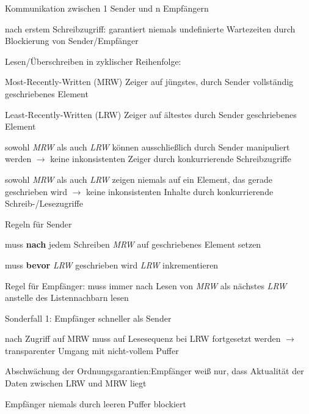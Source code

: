 \documentclass[a4paper]{article}
\begin{document}
\begin{multicols}{3}
\begin{center}
        Kommunikation zwischen 1 Sender und n Empfängern
    \end{center}
    \begin{itemize*}
        \item nach erstem Schreibzugriff: garantiert niemals undefinierte Wartezeiten durch Blockierung von Sender/Empfänger
        \item Lesen/Überschreiben in zyklischer Reihenfolge:
        \item Most-Recently-Written (MRW) Zeiger auf jüngstes, durch Sender vollständig geschriebenes Element
        \item Least-Recently-Written (LRW) Zeiger auf ältestes durch Sender geschriebenes Element
        \item sowohl \emph{MRW} als auch \emph{LRW} können ausschließlich durch Sender manipuliert werden $\rightarrow$ keine inkonsistenten Zeiger durch konkurrierende Schreibzugriffe
        \item sowohl \emph{MRW} als auch \emph{LRW} zeigen niemals auf ein Element, das gerade geschrieben wird $\rightarrow$ keine inkonsistenten Inhalte durch konkurrierende Schreib-/Lesezugriffe
        \item Regeln für Sender
        \begin{itemize*}
            \item muss \textbf{nach} jedem Schreiben \emph{MRW} auf geschriebenes Element setzen
            \item muss \textbf{bevor} \emph{LRW} geschrieben wird \emph{LRW} inkrementieren
        \end{itemize*}
        \item Regel für Empfänger: muss immer nach Lesen von \emph{MRW} als nächstes \emph{LRW} anstelle des Listennachbarn lesen
    \end{itemize*}

    Sonderfall 1: Empfänger schneller als Sender
    \begin{itemize*}
        \item nach Zugriff auf MRW muss auf Lesesequenz bei LRW fortgesetzt werden $\rightarrow$ transparenter Umgang mit nicht-vollem Puffer
        \item Abschwächung der Ordnungsgarantien:Empfänger weiß nur, dass Aktualität der Daten zwischen LRW und MRW liegt
        \item Empfänger niemals durch leeren Puffer blockiert
    \end{itemize*}


\end{multicols}
\end{document}
